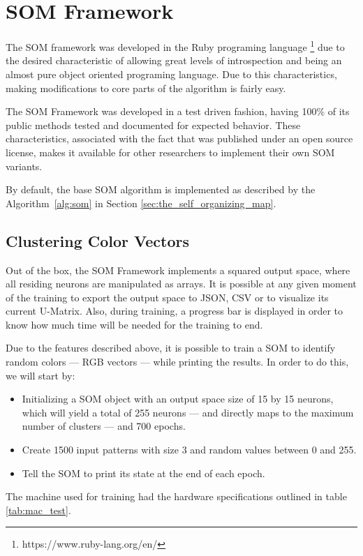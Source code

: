\documentclass[journal]{IEEEtran}
\begin{document}
\section{SOM Framework}
\label{sec:som_framework}
The \ac{SOM} framework was developed in the Ruby programing language \footnote{https://www.ruby-lang.org/en/} due to the desired characteristic of allowing great levels of introspection and being an almost pure object oriented programing language. Due to this characteristics, making modifications to core parts of the algorithm is fairly easy.

The \ac{SOM} Framework was developed in a test driven fashion, having 100\% of its public methods tested and documented for expected behavior. These characteristics, associated with the fact that was published under an open source license, makes it available for other researchers to implement their own SOM variants.

By default, the base SOM algorithm is implemented as described by the Algorithm~\ref{alg:som} in Section \ref{sec:the_self_organizing_map}. 
\subsection{Clustering Color Vectors}
\label{sub:main_features}
Out of the box, the \ac{SOM} Framework implements a squared output space, where all residing neurons are manipulated as arrays. It is possible at any given moment of the training to export the output space to \ac{JSON}, \ac{CSV} or to visualize its current \ac{U-Matrix}. Also, during training, a progress bar is displayed in order to know how much time will be needed for the training to end.

Due to the features described above, it is possible to train a \ac{SOM} to identify random colors --- RGB vectors --- while printing the results. In order to do this, we will start by:
\begin{itemize}
  \item Initializing a SOM object with an output space size of 15 by 15 neurons, which will yield a total of 255 neurons --- and directly maps to the maximum number of clusters --- and 700 epochs.
  \item Create 1500 input patterns with size 3 and random values between 0 and 255. 
  \item Tell the SOM to print its state at the end of each epoch.
\end{itemize}
The machine used for training had the hardware specifications outlined in table \ref{tab:mac_test}.
\end{document}
